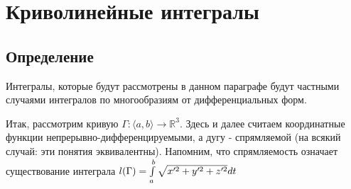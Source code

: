 \section{Криволинейные интегралы}

\subsection{Определение}

Интегралы, которые будут рассмотрены в данном параграфе будут частными случаями интегралов по многообразиям от дифференциальных форм.

Итак, рассмотрим кривую $\Gamma : \langle a, b \rangle \rightarrow \mathbb{R}^3$. 
Здесь и далее считаем координатные функции непрерывно-дифференцируемыми, а дугу - спрямляемой 
(на всякий случай: эти понятия эквивалентны).
Напомним, что спрямляемость означает существование интеграла $l(\Gamma) = \int\limits_{a}^{b} \sqrt{x'^2 + y'^2 + z'^2}dt$

